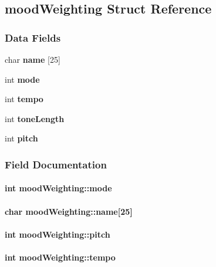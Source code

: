 \subsection{mood\+Weighting Struct Reference}
\label{structmood_weighting}
\subsubsection*{Data Fields}
\begin{DoxyCompactItemize}
\item 
char {\bf name} [25]
\item 
int {\bf mode}
\item 
int {\bf tempo}
\item 
int {\bf tone\+Length}
\item 
int {\bf pitch}
\end{DoxyCompactItemize}


\subsubsection{Field Documentation}
\paragraph[{mode}]{\setlength{\rightskip}{0pt plus 5cm}int mood\+Weighting\+::mode}\label{structmood_weighting_a61010f3a9441ad3cabbe94a31a64dad5}
\paragraph[{name}]{\setlength{\rightskip}{0pt plus 5cm}char mood\+Weighting\+::name[25]}\label{structmood_weighting_af578d935b7734ea6944946a2ad9132af}
\paragraph[{pitch}]{\setlength{\rightskip}{0pt plus 5cm}int mood\+Weighting\+::pitch}\label{structmood_weighting_a27410ec4f299961816407657a3e241e8}
\paragraph[{tempo}]{\setlength{\rightskip}{0pt plus 5cm}int mood\+Weighting\+::tempo}\label{structmood_weighting_a9b2180e8a4aab163ae48d0a66269a840}

